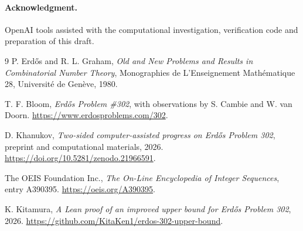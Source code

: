 \documentclass[11pt,letterpaper]{article}
\theoremstyle{definition}
\begin{document}
\paragraph{Acknowledgment.}
OpenAI tools assisted with the computational investigation, verification
code and preparation of this draft.

\begin{thebibliography}{9}
P. Erd\H{o}s and R. L. Graham,
\emph{Old and New Problems and Results in Combinatorial Number Theory},
Monographies de L'Enseignement Math\'ematique 28, Universit\'e de
Genève, 1980.

T. F. Bloom, \emph{Erd\H{o}s Problem \#302}, with observations by
S. Cambie and W. van Doorn. \url{https://www.erdosproblems.com/302}.

D. Khanukov, \emph{Two-sided computer-assisted progress on Erd\H{o}s
Problem 302}, preprint and computational materials, 2026.
\url{https://doi.org/10.5281/zenodo.21966591}.

The OEIS Foundation Inc., \emph{The On-Line Encyclopedia of Integer
Sequences}, entry A390395. \url{https://oeis.org/A390395}.

K. Kitamura, \emph{A Lean proof of an improved upper bound for Erd\H{o}s
Problem 302}, 2026. \url{https://github.com/KitaKen1/erdos-302-upper-bound}.
\end{thebibliography}
\end{document}
